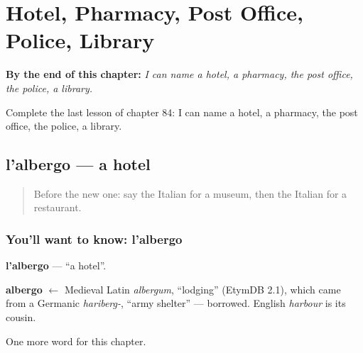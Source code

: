 
\chapter{Hotel, Pharmacy, Post Office, Police, Library}
\label{ch:it-hotel-pharmacy-post-office-police-library}

\begin{chapteropening}
\textbf{By the end of this chapter:} \emph{I can name a hotel, a pharmacy, the post office, the police, a library.}

Complete the last lesson of chapter 84: I can name a hotel, a pharmacy, the post office, the police, a library.
\end{chapteropening}

\section[l'albergo]{l'albergo — a hotel}

\label{lesson:IT-C84-albergo}



\begin{quote}
Before the new one: say the Italian for a museum, then the Italian for a restaurant.
\end{quote}

\subsection*{You'll want to know: l'albergo}
\textbf{l'albergo} — \textquotedblleft{}a hotel\textquotedblright{}.

\begin{cousinweb}
\textbf{albergo} $\leftarrow$ Medieval Latin \emph{albergum}, \textquotedblleft{}lodging\textquotedblright{} (EtymDB 2.1), which came from a Germanic \emph{hariberg-}, \textquotedblleft{}army shelter\textquotedblright{} — borrowed. English \emph{harbour} is its cousin.
\end{cousinweb}

\begin{grammarlens}[title={What you've built}]
One more word for this chapter.
\end{grammarlens}

